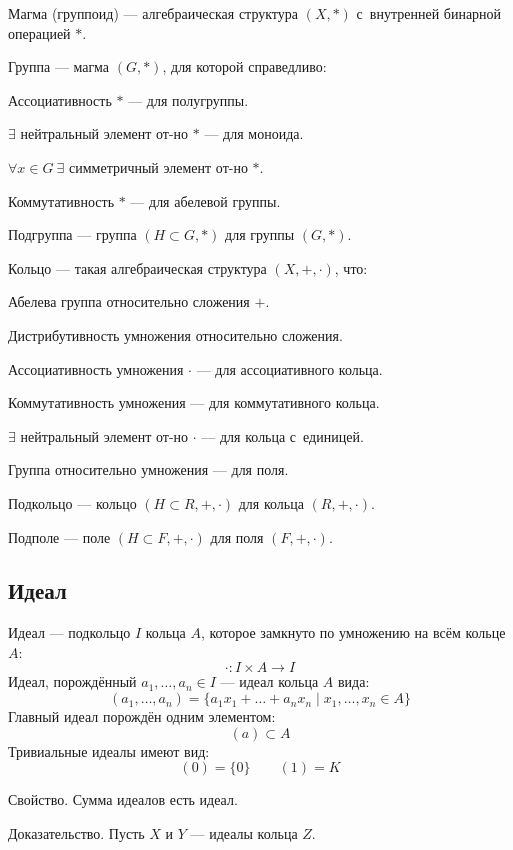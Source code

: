 {\bold Магма} {\ital (группоид)} --- алгебраическая структура $(X,\ast)$ с~внутренней бинарной операцией $\ast$.

{\bold Группа} --- магма $(G,\ast)$, для которой справедливо:
\begin{list*}[][\#]
\item Ассоциативность $\ast$ --- для {\bold полугруппы}.
\item $\exists$ нейтральный элемент от-но $\ast$ --- для {\bold моноида}.
\item $\forall x\in G\ \exists$ симметричный элемент от-но $\ast$.
{\color{desc}\item Коммутативность $\ast$ --- для {\bold абелевой} группы.}
\end{list*}
{\bold Подгруппа} --- группа $(H\subset G,\ast)$ для группы $(G,\ast)$.

{\bold Кольцо} --- такая алгебраическая структура $(X,+,\cdot)$, что:
\begin{list*}[][\#]
\item Абелева группа относительно {\ital сложения} $+$.
\item Дистрибутивность {\ital умножения} относительно {\ital сложения}.
{\color{desc}\item Ассоциативность {\ital умножения} $\cdot$ --- для {\bold ассоциативного кольца}.}
{\color{desc}\item Коммутативность {\ital умножения} --- для {\bold коммутативного кольца}.}
{\color{desc}\item $\exists$ нейтральный элемент от-но $\cdot$ --- для {\bold кольца с~единицей}.}
{\color{desc}\item Группа относительно {\ital умножения} --- для {\bold поля}.}
\end{list*}

{\bold Подкольцо} --- кольцо $(H\subset R,+,\cdot)$ для кольца $(R,+,\cdot)$.

{\bold Подполе} --- поле $(H\subset F,+,\cdot)$ для поля $(F,+,\cdot)$.

\subsection{Идеал}

{\bold Идеал} --- подкольцо $I$ кольца $A$, которое замкнуто по умножению на всём кольце $A$:
$$\cdot\colon I\times A\to I$$
{\bold Идеал, порождённый} $a_1,\dots,a_n\in I$ --- идеал кольца $A$ вида:
$$(a_1,\dots,a_n)=\{a_1x_1+\dots+a_nx_n\mid x_1,\dots,x_n\in A\}$$
{\bold Главный идеал} порождён одним элементом:
$$(a)\subset A$$
{\bold Тривиальные идеалы} имеют вид:
$$(0)=\{0\}\qquad (1)=K$$
\begin{theorem}
{\bold Свойство.} Сумма идеалов есть идеал.
\end{theorem}
{\bold Доказательство.} Пусть $X$ и $Y$ --- идеалы кольца $Z$.

